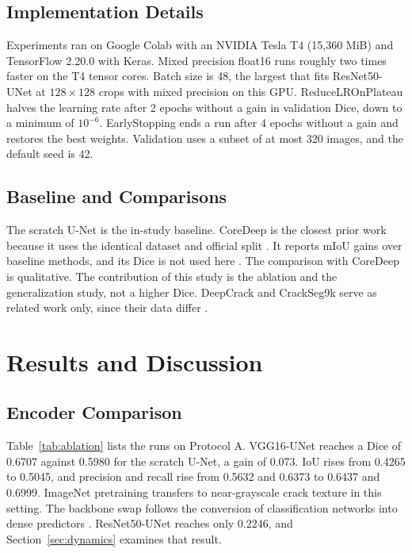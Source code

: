 \documentclass[conference]{IEEEtran}
\begin{document}
\subsection{Implementation Details}
Experiments ran on Google Colab with an NVIDIA Tesla T4 (15,360 MiB) and TensorFlow 2.20.0 with Keras. Mixed precision float16 runs roughly two times faster on the T4 tensor cores. Batch size is 48, the largest that fits ResNet50-UNet at $128\times128$ crops with mixed precision on this GPU. ReduceLROnPlateau halves the learning rate after 2 epochs without a gain in validation Dice, down to a minimum of $10^{-6}$. EarlyStopping ends a run after 4 epochs without a gain and restores the best weights. Validation uses a subset of at most 320 images, and the default seed is 42.

\subsection{Baseline and Comparisons}
The scratch U-Net is the in-study baseline. CoreDeep is the closest prior work because it uses the identical dataset and official split \cite{coredeep}. It reports mIoU gains over baseline methods, and its Dice is not used here \cite{coredeep}. The comparison with CoreDeep is qualitative. The contribution of this study is the ablation and the generalization study, not a higher Dice. DeepCrack and CrackSeg9k serve as related work only, since their data differ \cite{deepcrack,crackseg9k}.

\section{Results and Discussion}
\label{sec:results}
\subsection{Encoder Comparison}
Table~\ref{tab:ablation} lists the runs on Protocol A. VGG16-UNet reaches a Dice of 0.6707 against 0.5980 for the scratch U-Net, a gain of 0.073. IoU rises from 0.4265 to 0.5045, and precision and recall rise from 0.5632 and 0.6373 to 0.6437 and 0.6999. ImageNet pretraining transfers to near-grayscale crack texture in this setting. The backbone swap follows the conversion of classification networks into dense predictors \cite{fcn}. ResNet50-UNet reaches only 0.2246, and Section~\ref{sec:dynamics} examines that result.
\end{document}
